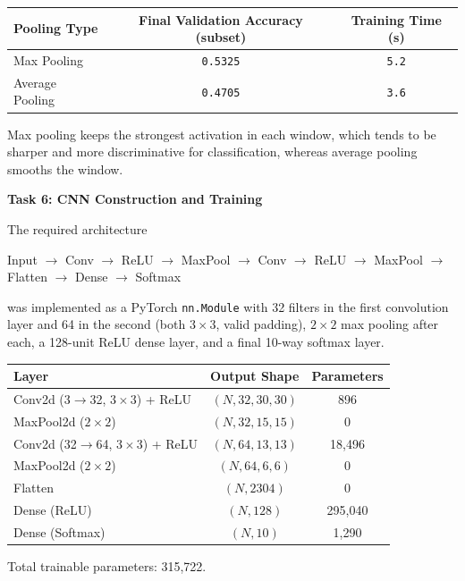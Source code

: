 \documentclass[11pt]{article}
\begin{document}
\begin{center}
\begin{tabular}{|l|c|c|}
\hline
Pooling Type & Final Validation Accuracy (subset) & Training Time (s)\\
\hline
Max Pooling & \texttt{0.5325} & \texttt{5.2}\\
Average Pooling & \texttt{0.4705} & \texttt{3.6}\\
\hline
\end{tabular}
\end{center}

Max pooling keeps the strongest activation in each window, which tends to be sharper and more discriminative for classification, whereas average pooling smooths the window.

\bigskip

\textbf{Task 6: CNN Construction and Training}

The required architecture

\begin{center}
Input $\rightarrow$ Conv $\rightarrow$ ReLU $\rightarrow$ MaxPool $\rightarrow$ Conv $\rightarrow$ ReLU $\rightarrow$ MaxPool $\rightarrow$ Flatten $\rightarrow$ Dense $\rightarrow$ Softmax
\end{center}

was implemented as a PyTorch \texttt{nn.Module} with 32 filters in the first convolution layer and 64 in the second (both $3\times3$, valid padding), $2\times2$ max pooling after each, a 128-unit ReLU dense layer, and a final 10-way softmax layer.

\begin{center}
\begin{tabular}{|l|c|c|}
\hline
Layer & Output Shape & Parameters\\
\hline
Conv2d (3$\to$32, $3\times3$) + ReLU & $(N,32,30,30)$ & 896\\
MaxPool2d ($2\times2$) & $(N,32,15,15)$ & 0\\
Conv2d (32$\to$64, $3\times3$) + ReLU & $(N,64,13,13)$ & 18,496\\
MaxPool2d ($2\times2$) & $(N,64,6,6)$ & 0\\
Flatten & $(N,2304)$ & 0\\
Dense (ReLU) & $(N,128)$ & 295,040\\
Dense (Softmax) & $(N,10)$ & 1,290\\
\hline
\end{tabular}
\end{center}

Total trainable parameters: 315,722.
\end{document}
